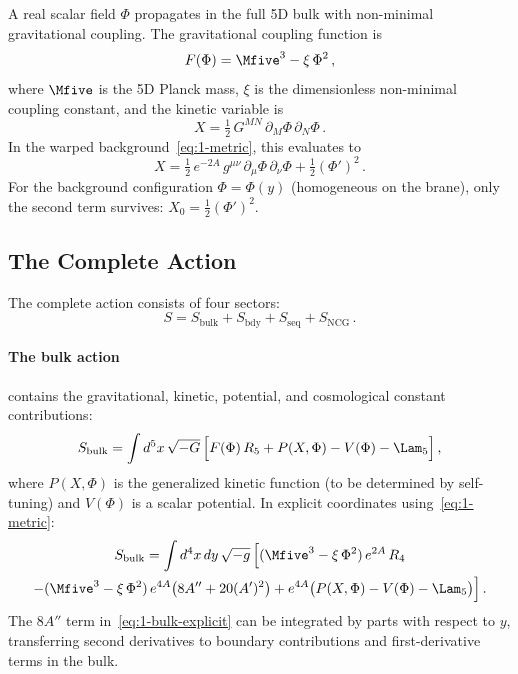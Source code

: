 A real scalar field $\Phi$ propagates in the full 5D bulk with non-minimal gravitational coupling. The gravitational coupling function is
\begin{equation}
\label{eq:1-coupling}
F(\Phi) = \Mfive^3 - \xi\,\Phi^2\,,
\end{equation}
where $\Mfive$ is the 5D Planck mass, $\xi$ is the dimensionless non-minimal coupling constant, and the kinetic variable is
\begin{equation}
\label{eq:1-kinetic-var}
X = \tfrac{1}{2}\, G^{MN}\, \partial_M \Phi\, \partial_N \Phi\,.
\end{equation}
In the warped background~\eqref{eq:1-metric}, this evaluates to
\begin{equation}
\label{eq:1-kinetic-warped}
X = \tfrac{1}{2}\, e^{-2A}\, g^{\mu\nu}\, \partial_\mu \Phi\, \partial_\nu \Phi + \tfrac{1}{2}(\Phi')^2\,.
\end{equation}
For the background configuration $\Phi = \Phi(y)$ (homogeneous on the brane), only the second term survives: $X_0 = \tfrac{1}{2}(\Phi')^2$.

\subsection{The Complete Action}
\label{sec:1-action}

The complete action consists of four sectors:
\begin{equation}
\label{eq:1-total-action}
S = S_{\mathrm{bulk}} + S_{\mathrm{bdy}} + S_{\mathrm{seq}} + S_{\mathrm{NCG}}\,.
\end{equation}

\paragraph{The bulk action} contains the gravitational, kinetic, potential, and cosmological constant contributions:
\begin{equation}
\label{eq:1-bulk-action}
S_{\mathrm{bulk}} = \int d^5x\, \sqrt{-G}\, \Bigl[F(\Phi)\, R_5 + P(X, \Phi) - V(\Phi) - \Lam_5\Bigr]\,,
\end{equation}
where $P(X, \Phi)$ is the generalized kinetic function (to be determined by self-tuning) and $V(\Phi)$ is a scalar potential. In explicit coordinates using~\eqref{eq:1-metric}:
\begin{multline}
\label{eq:1-bulk-explicit}
S_{\mathrm{bulk}} = \int d^4x\, dy\, \sqrt{-g}\, \Bigl[(\Mfive^3 - \xi\,\Phi^2)\, e^{2A}\, R_4 \\
- (\Mfive^3 - \xi\,\Phi^2)\, e^{4A}\bigl(8A'' + 20(A')^2\bigr) + e^{4A}\bigl(P(X,\Phi) - V(\Phi) - \Lam_5\bigr)\Bigr]\,.
\end{multline}
The $8A''$ term in~\eqref{eq:1-bulk-explicit} can be integrated by parts with respect to $y$, transferring second derivatives to boundary contributions and first-derivative terms in the bulk.

